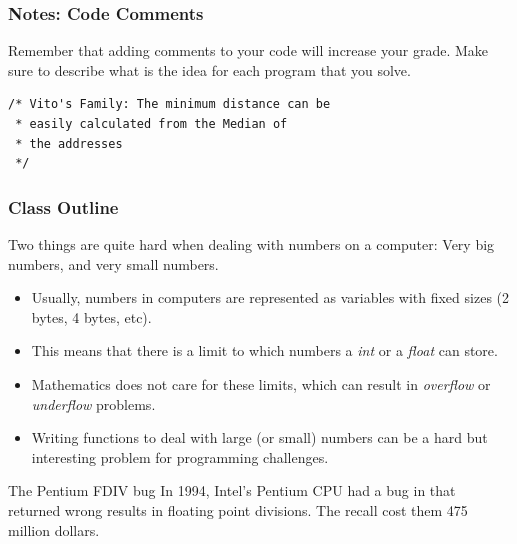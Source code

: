 \documentclass{beamer}
\begin{document}
\begin{frame}
  \frametitle{Notes: Code Comments}
  \begin{block}{}
    Remember that adding comments to your code will increase your
    grade. Make sure to describe what is the idea for each program
    that you solve.
  \end{block}

  \bigskip

\begin{verbatim}
/* Vito's Family: The minimum distance can be 
 * easily calculated from the Median of 
 * the addresses
 */
\end{verbatim}
  
\end{frame}

\begin{frame}
  \frametitle{Class Outline}
  \begin{block}{}
    Two things are quite hard when dealing with numbers on a computer:
    Very big numbers, and very small numbers.
  \end{block}

  {\small
  \begin{itemize}
    \item Usually, numbers in computers are represented as variables
      with fixed sizes (2 bytes, 4 bytes, etc).
    \item This means that there is a limit to which numbers a
      \emph{int} or a \emph{float} can store.
    \item Mathematics does not care for these limits, which can result
      in \emph{overflow} or \emph{underflow} problems.
    \item Writing functions to deal with large (or small) numbers can
      be a hard but interesting problem for programming challenges.
  \end{itemize}
  }

  {\smaller
  \begin{block}{The Pentium FDIV bug}
    In 1994, Intel's Pentium CPU had a bug in that returned wrong
    results in floating point divisions. The recall cost them 475
    million dollars.
  \end{block}
  }
  
\end{frame}
\end{document}

